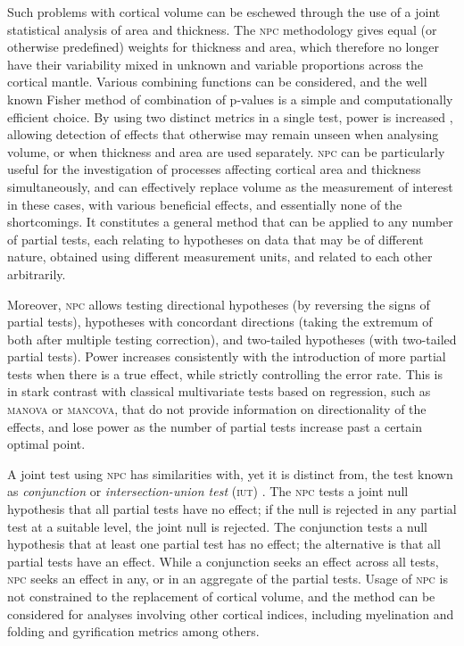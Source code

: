 Such problems with cortical volume can be eschewed through the use of a joint statistical analysis of area and thickness. The \textsc{npc} methodology gives equal (or otherwise predefined) weights for thickness and area, which therefore no longer have their variability mixed in unknown and variable proportions across the cortical mantle. Various combining functions can be considered, and the well known Fisher method of combination of p-values \citep{Fisher1932} is a simple and computationally efficient choice. By using two distinct metrics in a single test, power is increased \citep{Pesarin2010, Winkler2016_npc}, allowing detection of effects that otherwise may remain unseen when analysing volume, or when thickness and area are used separately. \textsc{npc} can be particularly useful for the investigation of processes affecting cortical area and thickness simultaneously, and can effectively replace volume as the measurement of interest in these cases, with various beneficial effects, and essentially none of the shortcomings. It constitutes a general method that can be applied to any number of partial tests, each relating to hypotheses on data that may be of different nature, obtained using different measurement units, and related to each other arbitrarily.

Moreover, \textsc{npc} allows testing directional hypotheses (by reversing the signs of partial tests), hypotheses with concordant directions (taking the extremum of both after multiple testing correction), and two-tailed hypotheses (with two-tailed partial tests). Power increases consistently with the introduction of more partial tests when there is a true effect, while strictly controlling the error rate. This is in stark contrast with classical multivariate tests based on regression, such as \textsc{manova} or \textsc{mancova}, that do not provide information on directionality of the effects, and lose power as the number of partial tests increase past a certain optimal point.

A joint test using \textsc{npc} has similarities with, yet it is distinct from, the test known as \emph{conjunction} or \emph{intersection-union test} (\textsc{iut}) \citep{Nichols2005}. The \textsc{npc} tests a joint null hypothesis that all partial tests have no effect; if the null is rejected in any partial test at a suitable level, the joint null is rejected. The conjunction tests a null hypothesis that at least one partial test has no effect; the alternative is that all partial tests have an effect. While a conjunction seeks an effect across all tests, \textsc{npc} seeks an effect in any, or in an aggregate of the partial tests. Usage of \textsc{npc} is not constrained to the replacement of cortical volume, and the method can be considered for analyses involving other cortical indices, including myelination \citep{Glasser2011, Sereno2012} and folding and gyrification metrics \citep{Mangin2004, Schaer2008, Toro2008} among others.

